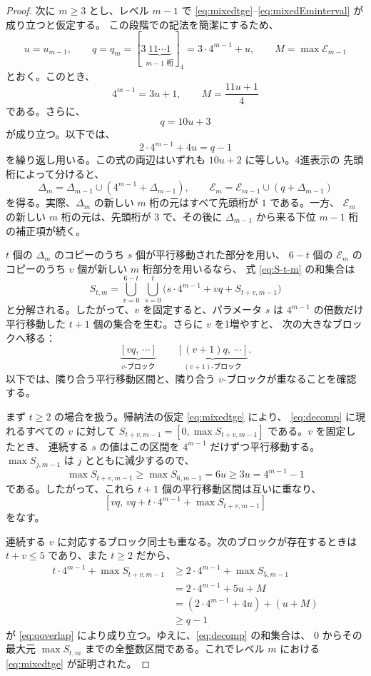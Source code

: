 \documentclass[12pt]{ltjsarticle}
\theoremstyle{plain}
\begin{document}
\begin{proof}
次に $m\geq3$ とし、レベル $m-1$ で
\eqref{eq:mixedtge}--\eqref{eq:mixedEminterval} が成り立つと仮定する。
この段階での記法を簡潔にするため、
\[
 u=u_{m-1},\qquad
 q=q_m=[3\underbrace{11\cdots1}_{m-1\text{ 桁}}]_4
      =3\cdot4^{m-1}+u,\qquad
 M=\max\mathcal E_{m-1}
\]
とおく。このとき、
\[
 4^{m-1}=3u+1,\qquad
 M=\frac{11u+1}{4}
\]
である。さらに、
\begin{equation}\label{eq:qmdef}
 q=10u+3
\end{equation}
が成り立つ。以下では、
\begin{equation}\label{eq:qoverlap}
 2\cdot4^{m-1}+4u=q-1
\end{equation}
を繰り返し用いる。この式の両辺はいずれも $10u+2$ に等しい。4進表示の
先頭桁によって分けると、
\[
 \Delta_m=\Delta_{m-1}\cup(4^{m-1}+\Delta_{m-1}),\qquad
 \mathcal E_m=\mathcal E_{m-1}\cup(q+\Delta_{m-1})
\]
を得る。実際、$\Delta_m$ の新しい $m$ 桁の元はすべて先頭桁が $1$ である。一方、
$\mathcal E_m$ の新しい $m$ 桁の元は、先頭桁が $3$ で、その後に
$\Delta_{m-1}$ から来る下位 $m-1$ 桁の補正項が続く。

$t$ 個の $\Delta_m$ のコピーのうち $s$ 個が平行移動された部分を用い、
$6-t$ 個の $\mathcal E_m$ のコピーのうち $v$ 個が新しい $m$ 桁部分を用いるなら、
式 \eqref{eq:S-t-m} の和集合は
\begin{equation}\label{eq:decomp}
 S_{t,m}=\bigcup_{v=0}^{6-t}\ \bigcup_{s=0}^{t}
 \bigl(s\cdot4^{m-1}+vq+S_{t+v,m-1}\bigr)
\end{equation}
と分解される。したがって、$v$ を固定すると、パラメータ $s$ は
$4^{m-1}$ の倍数だけ平行移動した $t+1$ 個の集合を生む。さらに $v$ を1増やすと、
次の大きなブロックへ移る：
\[
 \underbrace{[vq,\ \cdots]}_{v\text{-ブロック}}
 \qquad
 \underbrace{[(v+1)q,\ \cdots]}_{(v+1)\text{-ブロック}}.
\]
以下では、隣り合う平行移動区間と、隣り合う $v$-ブロックが重なることを確認する。

まず $t\geq2$ の場合を扱う。帰納法の仮定 \eqref{eq:mixedtge} により、
\eqref{eq:decomp} に現れるすべての $v$ に対して
$S_{t+v,m-1}=[0,\max S_{t+v,m-1}]$ である。$v$ を固定したとき、
連続する $s$ の値はこの区間を $4^{m-1}$ だけずつ平行移動する。
$\max S_{j,m-1}$ は $j$ とともに減少するので、
\[
 \max S_{t+v,m-1}\geq\max S_{6,m-1}=6u
     \geq3u=4^{m-1}-1
\]
である。したがって、これら $t+1$ 個の平行移動区間は互いに重なり、
\[
 [vq,\,vq+t\cdot4^{m-1}+\max S_{t+v,m-1}]
\]
をなす。

連続する $v$ に対応するブロック同士も重なる。次のブロックが存在するときは
$t+v\leq5$ であり、また $t\geq2$ だから、
\[
\begin{aligned}
 t\cdot4^{m-1}+\max S_{t+v,m-1}
 &\geq2\cdot4^{m-1}+\max S_{5,m-1}\\
 &=2\cdot4^{m-1}+5u+M\\
 &=(2\cdot4^{m-1}+4u)+(u+M)\\
 &\geq q-1
\end{aligned}
\]
が \eqref{eq:qoverlap} により成り立つ。ゆえに、\eqref{eq:decomp} の和集合は、
$0$ からその最大元 $\max S_{t,m}$ までの全整数区間である。これでレベル $m$ における
\eqref{eq:mixedtge} が証明された。


\end{proof}
\end{document}
